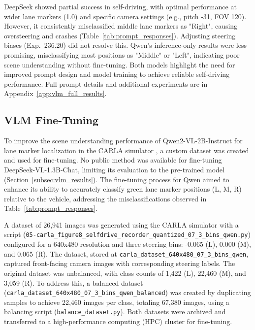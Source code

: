 DeepSeek showed partial success in self-driving, with optimal performance at wider lane markers (1.0) and specific camera settings (e.g., pitch -31, FOV 120). However, it consistently misclassified middle lane markers as "Right", causing oversteering and crashes (Table~\ref{tab:prompt_responses}). Adjusting steering biases (Exp.~236.20) did not resolve this. Qwen's inference-only results were less promising, misclassifying most positions as "Middle" or "Left", indicating poor scene understanding without fine-tuning. Both models highlight the need for improved prompt design and model training to achieve reliable self-driving performance. Full prompt details and additional experiments are in Appendix~\ref{app:vlm_full_results}.


\subsection{VLM Fine-Tuning}
\label{subsec:vlm_finetuning}

To improve the scene understanding performance of Qwen2-VL-2B-Instruct for lane marker localization in the CARLA simulator \cite{carla}, a custom dataset was created and used for fine-tuning. No public method was available for fine-tuning DeepSeek-VL-1.3B-Chat, limiting its evaluation to the pre-trained model (Section~\ref{subsec:vlm_results}). The fine-tuning process for Qwen aimed to enhance its ability to accurately classify green lane marker positions (L, M, R) relative to the vehicle, addressing the misclassifications observed in Table~\ref{tab:prompt_responses}.

A dataset of 26,941 images was generated using the CARLA simulator with a script (\texttt{05-carla\_figure8\_selfdrive\_recorder\_quantized\_07\_3\_bins\_qwen.py}) configured for a 640x480 resolution and three steering bins: -0.065 (L), 0.000 (M), and 0.065 (R). The dataset, stored at \texttt{carla\_dataset\_640x480\_07\_3\_bins\_qwen}, captured front-facing camera images with corresponding steering labels. The original dataset was unbalanced, with class counts of 1,422 (L), 22,460 (M), and 3,059 (R). To address this, a balanced dataset (\texttt{carla\_dataset\_640x480\_07\_3\_bins\_qwen\_balanced}) was created by duplicating samples to achieve 22,460 images per class, totaling 67,380 images, using a balancing script (\texttt{balance\_dataset.py}). Both datasets were archived and transferred to a high-performance computing (HPC) cluster for fine-tuning.

